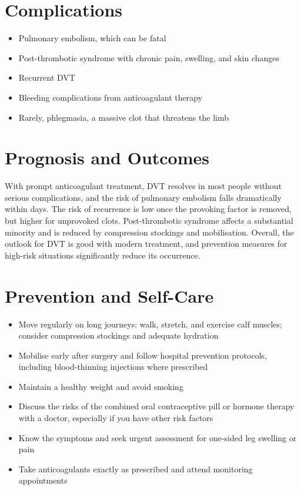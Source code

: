 \section*{Complications}
\begin{itemize}
    \item Pulmonary embolism, which can be fatal
    \item Post-thrombotic syndrome with chronic pain, swelling, and skin changes
    \item Recurrent DVT
    \item Bleeding complications from anticoagulant therapy
    \item Rarely, phlegmasia, a massive clot that threatens the limb
\end{itemize}

\section*{Prognosis and Outcomes}
With prompt anticoagulant treatment, DVT resolves in most people without serious complications, and the risk of pulmonary embolism falls dramatically within days. The risk of recurrence is low once the provoking factor is removed, but higher for unprovoked clots. Post-thrombotic syndrome affects a substantial minority and is reduced by compression stockings and mobilisation. Overall, the outlook for DVT is good with modern treatment, and prevention measures for high-risk situations significantly reduce its occurrence.

\section*{Prevention and Self-Care}
\begin{itemize}
    \item Move regularly on long journeys: walk, stretch, and exercise calf muscles; consider compression stockings and adequate hydration
    \item Mobilise early after surgery and follow hospital prevention protocols, including blood-thinning injections where prescribed
    \item Maintain a healthy weight and avoid smoking
    \item Discuss the risks of the combined oral contraceptive pill or hormone therapy with a doctor, especially if you have other risk factors
    \item Know the symptoms and seek urgent assessment for one-sided leg swelling or pain
    \item Take anticoagulants exactly as prescribed and attend monitoring appointments
\end{itemize}

